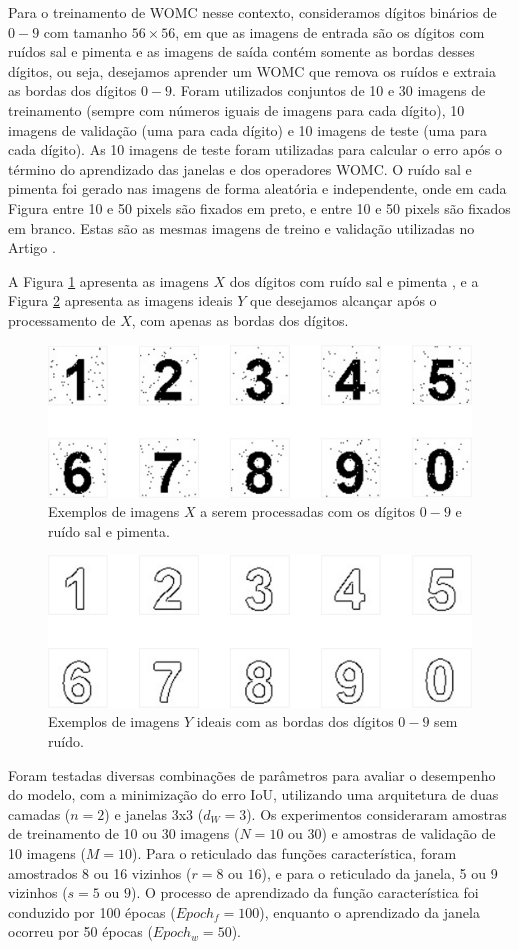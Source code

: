 Para o treinamento de WOMC nesse contexto, consideramos dígitos binários de $0-9$ com tamanho $56 \times 56$, em que as imagens de entrada são os dígitos com ruídos sal e pimenta e as imagens de saída contém somente as bordas desses dígitos, ou seja, desejamos aprender um WOMC que remova os ruídos e extraia as bordas dos dígitos $0-9$. Foram utilizados conjuntos de 10 e 30 imagens de treinamento (sempre com números iguais de imagens para cada dígito), 10 imagens de validação (uma para cada dígito) e 10 imagens de teste (uma para cada dígito). As 10 imagens de teste foram utilizadas para calcular o erro após o término do aprendizado das janelas e dos operadores WOMC. O ruído sal e pimenta foi gerado nas imagens de forma aleatória e independente, onde em cada Figura entre 10 e 50 pixels são fixados em preto, e entre 10 e 50 pixels são fixados em branco. Estas são as mesmas imagens de treino e validação utilizadas no Artigo \cite{DIEGO:DMM}.

A Figura \ref{fig:dig_X} apresenta as imagens $X$ dos dígitos com ruído sal e pimenta \cite{imageprocessing}, e a Figura \ref{fig:dig_Y} apresenta as imagens ideais $Y$ que desejamos alcançar após o processamento de $X$, com apenas as bordas dos dígitos.

\begin{figure}
    \centering
    \includegraphics[width=.4\textwidth]{figuras/digitos_input.png}
    \caption{Exemplos de imagens $X$ a serem processadas com os dígitos $0-9$ e ruído sal e pimenta.}
    \label{fig:dig_X}
\end{figure}

\begin{figure}
    \centering
    \includegraphics[width=.4\textwidth]{figuras/digitos_target.png}
    \caption{Exemplos de imagens $Y$ ideais com as bordas dos dígitos $0-9$ sem ruído.}
    \label{fig:dig_Y}
\end{figure}

Foram testadas diversas combinações de parâmetros para avaliar o desempenho do modelo, com a minimização do erro IoU, utilizando uma arquitetura de duas camadas ($n = 2$) e janelas 3x3 ($d_{W} = 3$). Os experimentos consideraram amostras de treinamento de 10 ou 30 imagens ($N = 10 \text{ ou } 30$) e amostras de validação de 10 imagens ($M = 10$). Para o reticulado das funções característica, foram amostrados 8 ou 16 vizinhos ($r = 8 \text{ ou } 16$), e para o reticulado da janela, 5 ou 9 vizinhos ($s = 5 \text{ ou } 9$). O processo de aprendizado da função característica foi conduzido por 100 épocas ($Epoch_f = 100$), enquanto o aprendizado da janela ocorreu por 50 épocas ($Epoch_w = 50$).

